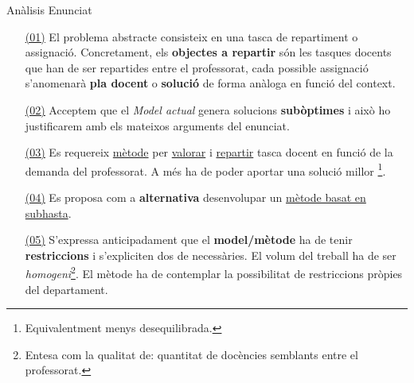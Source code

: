 \documentclass[twocolumn]{beamer}
\begin{document}
\begin{frame}
\begin{block}{Anàlisis Enunciat}
\begin{itemize}
	\footnotesize
	\item[{ \color{cyan!60} \underline{\underline{\normalcolor (01)}}}] El problema abstracte consisteix en una tasca de repartiment o assignació. Concretament, els \textbf{objectes a repartir} són les tasques docents que han de ser repartides entre  el professorat, cada possible assignació s'anomenarà \textbf{pla docent} o \textbf{solució} de forma anàloga en funció del context.\\
	\item[{ \color{blue!60} \underline{\underline{\normalcolor (02)}}}] Acceptem que el \textit{Model actual} genera solucions \textbf{subòptimes} i això ho  justificarem amb els mateixos arguments del enunciat.\\
	\item[{ \color{green!60} \underline{\underline{\normalcolor (03)}}}] Es requereix { \color{green!60} \underline{\normalcolor mètode}} per { \color{green!60} \underline{\normalcolor valorar}} i { \color{green!60} \underline{\normalcolor repartir}} tasca docent en funció de la demanda del professorat. A més ha de poder aportar una solució millor \footnote{Equivalentment menys desequilibrada.}. 
	\item[{ \color{purple!60} \underline{\underline{\normalcolor (04)}}}] Es proposa com a \textbf{alternativa}  desenvolupar un  { \color{purple!60} \underline{\normalcolor mètode basat en subhasta}}.
	\item[{ \color{violet!60} \underline{\underline{\normalcolor (05)}}}] S'expressa anticipadament que el \textbf{model/mètode} ha de tenir \textbf{restriccions}  i s'expliciten dos de necessàries. El volum del treball ha de ser \textit{homogeni}\footnote{Entesa com la qualitat de: quantitat de docències semblants entre el professorat.}. El mètode ha de contemplar la possibilitat de restriccions pròpies del departament. 
\end{itemize}
\end{block}
\end{frame}
\end{document}
